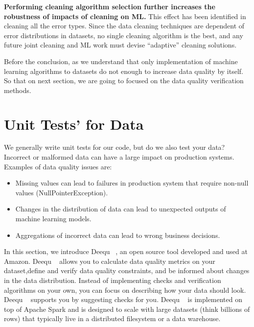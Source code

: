 \textbf{Performing cleaning algorithm selection further increases the robustness of impacts of cleaning on ML. }This effect has been identified in cleaning all the error types. Since the data cleaning techniques are dependent of error distributions in datasets, no single cleaning algorithm is the best, and any future joint cleaning and
ML work must devise “adaptive” cleaning solutions.

Before the conclusion, as we understand that only implementation of machine learning algorithms to datasets do not enough to increase data quality by itself. So that on next section, we are going to focused on the data quality verification methods.  

\section{Unit Tests' for Data} \label{sec:unit-test-for-data}

We generally write unit tests for our code, but do we also test your data? Incorrect or malformed data can have a large impact on production systems. 
Examples of data quality issues are:

\begin{itemize}
	\item {Missing values can lead to failures in production system that require non-null values (NullPointerException).
	}	
	\item {
		Changes in the distribution of data can lead to unexpected outputs of machine learning models.
	}
	\item {
		Aggregations of incorrect data can lead to wrong business decisions.
	}
\end{itemize}

In this section, we introduce Deequ ~\cite{Schelter:2018:ALD:3229863.3275547}, an open source tool developed and used at Amazon. Deequ ~\cite{Schelter:2018:ALD:3229863.3275547} allows you to calculate data quality metrics on your dataset,define and verify data quality constraints, and be informed about changes in the data distribution. Instead of implementing checks and verification algorithms on your own, you can focus on describing how your data should look. 
Deequ ~\cite{Schelter:2018:ALD:3229863.3275547} supports you by suggesting checks for you. Deequ ~\cite{Schelter:2018:ALD:3229863.3275547} is implemented on top of Apache Spark and is designed to 
scale with large datasets (think billions of rows) that typically live in a distributed filesystem or a data warehouse.

